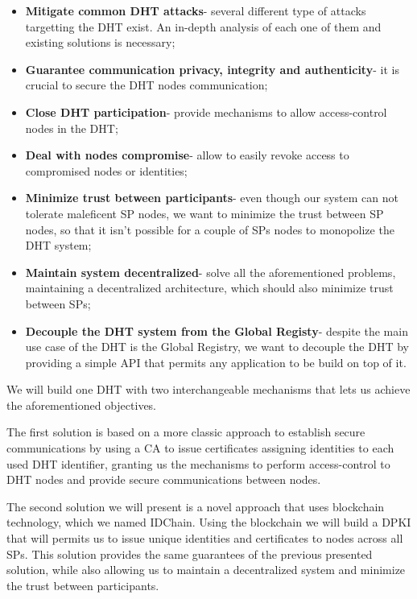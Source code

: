 \begin{itemize}
  \item \textbf{Mitigate common \ac{DHT} attacks}- several different type of attacks targetting the \ac{DHT} exist. An in-depth analysis of each one of them and existing solutions is necessary;
	\item \textbf{Guarantee communication privacy, integrity and authenticity}- it is crucial to secure the \ac{DHT} nodes communication;
	\item \textbf{Close DHT participation}- provide mechanisms to allow access-control nodes in the \ac{DHT};
	\item \textbf{Deal with nodes compromise}- allow to easily revoke access to compromised nodes or identities;
  \item \textbf{Minimize trust between participants}- even though our system can not tolerate maleficent \ac{SP} nodes, we want to minimize the trust between \ac{SP} nodes, so that it isn't possible for a couple of \acp{SP} nodes to monopolize the DHT system;
  \item \textbf{Maintain system decentralized}- solve all the aforementioned problems, maintaining a decentralized architecture, which should also minimize trust between \acp{SP};
  \item \textbf{Decouple the DHT system from the Global Registy}- despite the main use case of the DHT is the Global Registry, we want to decouple the DHT by providing a simple \ac{API} that permits any application to be build on top of it.
\end{itemize}

We will build one DHT with two interchangeable mechanisms that lets us achieve the aforementioned objectives.

The first solution is based on a more classic approach to establish secure communications by using a \acl{CA} to issue certificates assigning identities to each used DHT identifier, granting us the mechanisms to perform access-control to \ac{DHT} nodes and provide secure communications between nodes.

The second solution we will present is a novel approach that uses blockchain technology, which we named IDChain.
Using the blockchain we will build a \ac{DPKI} that will permits us to issue unique identities and certificates to nodes across all \acp{SP}.
This solution provides the same guarantees of the previous presented solution, while also allowing us to maintain a decentralized system and minimize the trust between participants.

